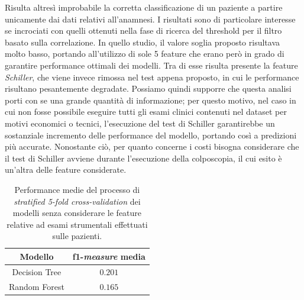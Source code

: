 Risulta altresì improbabile la corretta classificazione di un paziente a partire unicamente dai dati relativi all'anamnesi.
I risultati sono di particolare interesse se incrociati con quelli ottenuti nella fase di ricerca del threshold per il filtro basato sulla correlazione.
In quello studio, il valore soglia proposto risultava molto basso, portando all'utilizzo di sole 5 feature che erano però in grado di garantire performance ottimali dei modelli.
Tra di esse risulta presente la feature \textit{Schiller}, che viene invece rimossa nel test appena proposto, in cui le performance risultano pesantemente degradate.
Possiamo quindi supporre che questa analisi porti con se una grande quantità di informazione; per questo motivo, nel caso in cui non fosse possibile eseguire tutti gli esami clinici contenuti nel dataset per motivi economici o tecnici, l'esecuzione del test di Schiller garantirebbe un sostanziale incremento delle performance del modello, portando così a predizioni più accurate.
Nonostante ciò, per quanto concerne i costi bisogna considerare che il test di Schiller avviene durante l'esecuzione della colposcopia, il cui esito è un'altra delle feature considerate.
\begin{table}
	\centering
	\caption{Performance medie del processo di \textit{stratified 5-fold cross-validation} dei modelli senza considerare le feature relative ad esami strumentali effettuati sulle pazienti.}
	\label{tab:noexamsscore}
	\begin{tabular}{|c|c|}
		\toprule
		Modello & f1-\textit{measure} media \\ 
		\midrule 
		Decision Tree & $0.201$ \\
		Random Forest & $0.165$ \\ 
		\bottomrule
	\end{tabular}
\end{table}